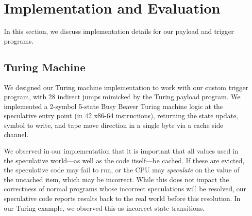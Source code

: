 
\section{Implementation and Evaluation}

In this section, we discuss implementation details for our payload and trigger
programs.

%



\subsection{Turing Machine}
\label{subsec:impl-turing}

We designed our Turing machine implementation to work with our custom trigger
program, with 28 indirect jumps mimicked by the Turing payload program.
We implemented a 2-symbol 5-state Busy Beaver Turing machine logic at the
speculative entry point (in 42 x86-64 instructions), returning the state update,
symbol to write, and tape move direction in a single byte via a cache side
channel.

We observed in our implementation that it is important that all values used in
the speculative world---as well as the code itself---be cached. If these are
evicted, the speculative code may fail to run, or the CPU may \emph{speculate}
on the value of the uncached item, which may be incorrect. While this does not
impact the correctness of normal programs whose incorrect speculations will be
resolved, our speculative code reports results back to the real world before
this resolution. In our Turing example, we observed this as incorrect state
transitions.

